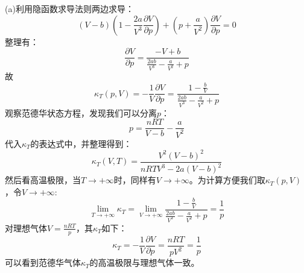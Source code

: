 \begin{solution}
        (a)利用隐函数求导法则两边求导：
        \begin{equation*}
                (V-b)(1-\frac{2a}{V^{3}}\frac{\partial V}{\partial p}) + (p+\frac{a}{V^{2}})\frac{\partial V}{\partial p} = 0 
        \end{equation*}
        整理有：
        \begin{equation*}
            \frac{\partial V}{\partial p} = \frac{-V+b}{\frac{2ab}{V^{3}}-\frac{a}{V^{2}}+p}
        \end{equation*}
        故
        \begin{equation*}
            \kappa_T(p,V) = -\frac{1}{V}\frac{\partial V}{\partial p} = \frac{1-\frac{b}{V}}{\frac{2ab}{V^{3}}-\frac{a}{V^{2}}+p}
        \end{equation*}
        观察范德华状态方程，发现我们可以分离$p$：
        \begin{equation*}
            p = \frac{nRT}{V-b}-\frac{a}{V^{2}}
        \end{equation*}
        代入$\kappa_T$的表达式中，并整理得到：
        \begin{equation*}
            \kappa_T(V,T) = \frac{V^{2}(V-b)^{2}}{nRTV^{3}-2a(V-b)^{2}}
        \end{equation*}
        然后看高温极限，当$T\rightarrow +\infty$时，同样有$V\rightarrow +\infty$。为计算方便我们取$\kappa_{T}(p,V)$，令$V\rightarrow +\infty$:
        \begin{equation*}
            \lim_{T\rightarrow +\infty}\kappa_T = \lim_{V \rightarrow +\infty}\frac{1-\frac{b}{V}}{\frac{2ab}{V^{3}}-\frac{a}{V^{2}}+p}=\frac{1}{p}
        \end{equation*}
        对理想气体$V = \frac{nRT}{p}$，其$\kappa_T$如下：
        \begin{equation*}
            \kappa_T = -\frac{1}{V}\frac{\partial V}{\partial p} = \frac{nRT}{pV^{2}} = \frac{1}{p}
        \end{equation*}
        可以看到范德华气体$\kappa_T$的高温极限与理想气体一致。
        \\
        

\end{solution}
